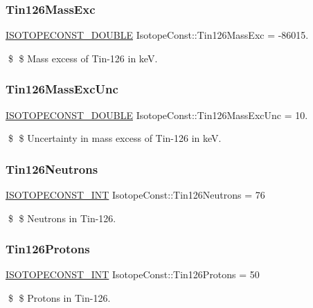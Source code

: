 \subsubsection{\texorpdfstring{Tin126\+Mass\+Exc}{Tin126MassExc}}
{\footnotesize\ttfamily \mbox{\hyperlink{group___isotope_const-_macros_ga8f45a7272ce02c0b4c65c44636ed719a}{I\+S\+O\+T\+O\+P\+E\+C\+O\+N\+S\+T\+\_\+\+D\+O\+U\+B\+LE}} Isotope\+Const\+::\+Tin126\+Mass\+Exc = -\/86015.}

\$ \$ Mass excess of Tin-\/126 in keV. \mbox{\label{group___isotope_const-_tin-_sn126_ga7dbba78c14677a140405e196046f441a}} 
\subsubsection{\texorpdfstring{Tin126\+Mass\+Exc\+Unc}{Tin126MassExcUnc}}
{\footnotesize\ttfamily \mbox{\hyperlink{group___isotope_const-_macros_ga8f45a7272ce02c0b4c65c44636ed719a}{I\+S\+O\+T\+O\+P\+E\+C\+O\+N\+S\+T\+\_\+\+D\+O\+U\+B\+LE}} Isotope\+Const\+::\+Tin126\+Mass\+Exc\+Unc = 10.}

\$ \$ Uncertainty in mass excess of Tin-\/126 in keV. \mbox{\label{group___isotope_const-_tin-_sn126_ga3b4be477beb872a04756f10cc25046a1}} 
\subsubsection{\texorpdfstring{Tin126\+Neutrons}{Tin126Neutrons}}
{\footnotesize\ttfamily \mbox{\hyperlink{group___isotope_const-_macros_ga5f18360b3e99483a35c32d789e62621c}{I\+S\+O\+T\+O\+P\+E\+C\+O\+N\+S\+T\+\_\+\+I\+NT}} Isotope\+Const\+::\+Tin126\+Neutrons = 76}

\$ \$ Neutrons in Tin-\/126. \mbox{\label{group___isotope_const-_tin-_sn126_gabdf6e1650621a73388e15da95142206e}} 
\subsubsection{\texorpdfstring{Tin126\+Protons}{Tin126Protons}}
{\footnotesize\ttfamily \mbox{\hyperlink{group___isotope_const-_macros_ga5f18360b3e99483a35c32d789e62621c}{I\+S\+O\+T\+O\+P\+E\+C\+O\+N\+S\+T\+\_\+\+I\+NT}} Isotope\+Const\+::\+Tin126\+Protons = 50}

\$ \$ Protons in Tin-\/126. 